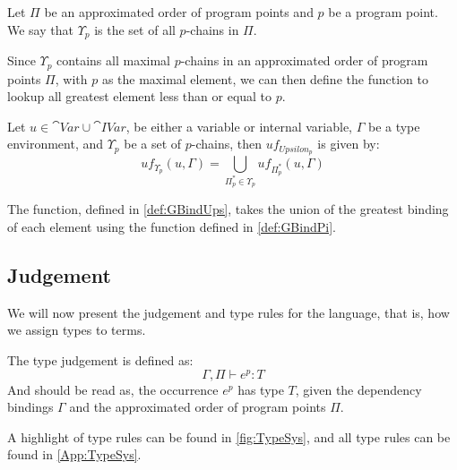\documentclass[../../master.tex]{subfiles}
\begin{document}
\begin{definition}[]
	Let $\Pi$ be an approximated order of program points and $p$ be a program point.
	We say that $\Upsilon_p$ is the set of all $p$-chains in $\Pi$.
\end{definition}

Since $\Upsilon_p$ contains all maximal $p$-chains in an approximated order of program points $\Pi$, with $p$ as the maximal element, we can then define the function to lookup all greatest element less than or equal to $p$.

\begin{definition}[]\label{def:GBindUps}
	Let $u\in \cat{Var}\cup\cat{IVar}$, be either a variable or internal variable, $\Gamma$ be a type environment, and $\Upsilon_p$ be a set of $p$-chains, then $uf_{Upsilon_p}$ is given by:
	$$uf_{\Upsilon_p}(u,\Gamma)=\bigcup_{\Pi_p^{*}\in\Upsilon_p}uf_{\Pi_p^{*}}(u,\Gamma)$$
\end{definition}

The function, defined in \cref{def:GBindUps}, takes the union of the greatest binding of each element using the function defined in \cref{def:GBindPi}.

\subsection{Judgement}\label{sec:Judge}
We will now present the judgement and type rules for the language, that is, how we assign types to terms.

The type judgement is defined as:
$$\Gamma,\Pi\vdash e^p: T$$
And should be read as, the occurrence $e^p$ has type $T$, given the dependency bindings $\Gamma$ and the approximated order of program points $\Pi$.

A highlight of type rules can be found in \cref{fig:TypeSys}, and all type rules can be found in \cref{App:TypeSys}.
\end{document}
